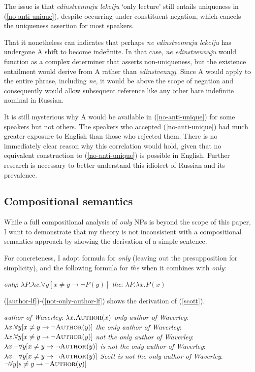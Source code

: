 The issue is that \textit{edinstvennuju lekciju} `only lecture' still entails uniqueness in (\ref{no-anti-unique}), despite occurring under constituent negation, which cancels the uniqueness assertion for most speakers.

That it nonetheless can indicates that perhaps \textit{ne edinstvennuju lekciju} has undergone  \textsc{A} shift to become indefinite. In that case, \textit{ne edinstvennuju} would function as a complex determiner that asserts non-uniqueness, but the existence entailment would derive from \textsc{A} rather than \textit{edinstvennyj}. Since \textsc{A} would apply to the entire phrase, including \textit{ne}, it would be above the scope of negation and consequently would allow subsequent reference like any other bare indefinite nominal in Russian.

It is still mysterious why \textsc{A} would be available in (\ref{no-anti-unique}) for some speakers but not others. The speakers who accepted (\ref{no-anti-unique}) had much greater exposure to English than those who rejected them. There is no immediately clear reason why this correlation would hold, given that no equivalent construction to (\ref{no-anti-unique}) is possible in English. Further research is necessary to better understand this idiolect of Russian and its prevalence.

\subsection{Compositional semantics}
While a full compositional analysis of \textit{only} NPs is beyond the scope of this paper, I want to demonstrate that my theory is not inconsistent with a compositional semantics approach by showing the derivation of a simple sentence.

For concreteness, I adopt  formula for \textit{only} (leaving out the presupposition for simplicity), and the following formula for \textit{the} when it combines with \textit{only}:

\begin{exe}
	\ex \textit{only}: $ \lambda P . \lambda x . \forall y [ x \ne y \to \neg P(y) ] $
	\ex \textit{the}: $\lambda P . \lambda x . P(x)$
\end{exe}

(\ref{author-lf})-(\ref{not-only-author-lf}) shows the derivation of (\ref{scott}).

\begin{exe}
	\ex \label{author-lf} \textit{author of Waverley}: $\lambda x . \textsc{Author}(x)$
	\ex \textit{only author of Waverley}: $\lambda x . \forall y [ x \ne y \to \neg \textsc{Author}(y) ]$
	\ex \textit{the only author of Waverley}: $\lambda x . \forall y [ x \ne y \to \neg \textsc{Author}(y) ]$
	\ex \textit{not the only author of Waverley}: $\lambda x . \neg  \forall y [ x \ne y \to \neg \textsc{Author}(y) ]$
	\ex \textit{is not the only author of Waverley}: $\lambda x . \neg  \forall y [ x \ne y \to \neg \textsc{Author}(y) ]$
	\ex \label{not-only-author-lf} \textit{Scott is not the only author of Waverley}: $\neg \forall y [ s \ne y \to \neg \textsc{Author}(y) ]$
\end{exe}

